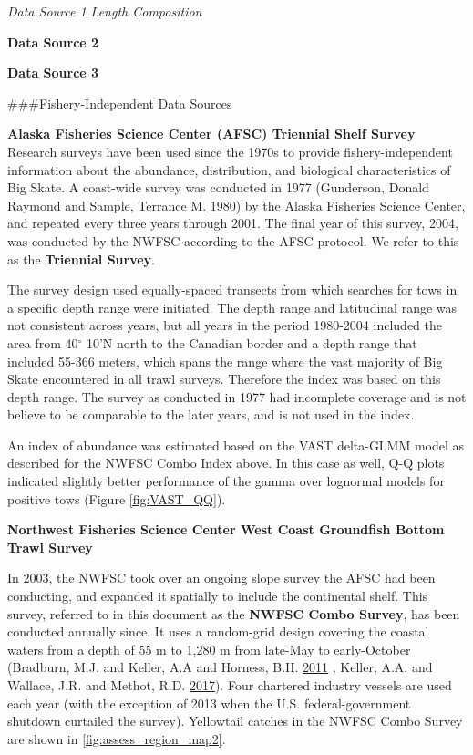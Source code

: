 \documentclass[12pt,]{article}
\begin{document}
\emph{Data Source 1 Length Composition}

\textbf{Data Source 2}

\textbf{Data Source 3}

\#\#\#Fishery-Independent Data Sources

\textbf{Alaska Fisheries Science Center (AFSC) Triennial Shelf Survey}\\
Research surveys have been used since the 1970s to provide
fishery-independent information about the abundance, distribution, and
biological characteristics of Big Skate. A coast-wide survey was
conducted in 1977 (Gunderson, Donald Raymond and Sample, Terrance M.
\protect\hyperlink{ref-Gunderson1980}{1980}) by the Alaska Fisheries
Science Center, and repeated every three years through 2001. The final
year of this survey, 2004, was conducted by the NWFSC according to the
AFSC protocol. We refer to this as the \textbf{Triennial Survey}.

The survey design used equally-spaced transects from which searches for
tows in a specific depth range were initiated. The depth range and
latitudinal range was not consistent across years, but all years in the
period 1980-2004 included the area from 40\(^\circ\) 10'N north to the
Canadian border and a depth range that included 55-366 meters, which
spans the range where the vast majority of Big Skate encountered in all
trawl surveys. Therefore the index was based on this depth range. The
survey as conducted in 1977 had incomplete coverage and is not believe
to be comparable to the later years, and is not used in the index.

An index of abundance was estimated based on the VAST delta-GLMM model
as described for the NWFSC Combo Index above. In this case as well, Q-Q
plots indicated slightly better performance of the gamma over lognormal
models for positive tows (Figure \ref{fig:VAST_QQ}).

\textbf{Northwest Fisheries Science Center West Coast Groundfish Bottom
Trawl Survey}

In 2003, the NWFSC took over an ongoing slope survey the AFSC had been
conducting, and expanded it spatially to include the continental shelf.
This survey, referred to in this document as the \textbf{NWFSC Combo
Survey}, has been conducted annually since. It uses a random-grid design
covering the coastal waters from a depth of 55 m to 1,280 m from
late-May to early-October (Bradburn, M.J. and Keller, A.A and Horness,
B.H. \protect\hyperlink{ref-Bradburn2011}{2011} , Keller, A.A. and
Wallace, J.R. and Methot, R.D.
\protect\hyperlink{ref-Keller2017}{2017}). Four chartered industry
vessels are used each year (with the exception of 2013 when the U.S.
federal-government shutdown curtailed the survey). Yellowtail catches in
the NWFSC Combo Survey are shown in \ref{fig:assess_region_map2}.
\end{document}
